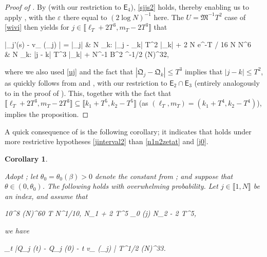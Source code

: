 \documentclass{amsart}
\numberwithin{equation}{section}
\DeclareMathOperator{\eff}{eff}
\newtheorem{cor}[thm]{Corollary}
\theoremstyle{remark}
\theoremstyle{definition}
\begin{document}
\begin{proof}[Proof of ]
		By  (with our restriction to $\mathsf{E}_4$), \eqref{sjjs2} holds, thereby enabling us to apply , with the $\varepsilon$ there equal to $(2 \log N)^{-1}$ here. The $U = \mathfrak{M}^{-1} T^2$ case of \eqref{wivi} then yields for $j \in \llbracket \ell_T + 2T^3, m_T - 2T^3 \rrbracket$ that
		\begin{flalign}
			\label{qj2} 
			\begin{aligned} 
				\big|_j'(s) - v_{\eff} (\Lambda_j) \big| = |_j| &  \log N \cdot \displaystyle\max_{k: |\mathfrak{Q}_j - _k| \le T^2} |_k| + 2 \log N \cdot e^{-T / 16 \log N} \cdot N^6 \\
				&  \log N \cdot \displaystyle\max_{k: |j - k| \le T^3} |_k| + N^{-1} \le B^2 ^{-1/2} (\log N)^{32},
			\end{aligned} 
		\end{flalign}
		
		\noindent where we also used \eqref{uj} and the fact that $|\mathfrak{Q}_j - \mathfrak{Q}_k| \le T^3$ implies that $|j-k| \le T^2$, as quickly follows from  and , with our restriction to $\mathsf{E}_2 \cap \mathsf{E}_3$ (entirely analogously to in the proof of ). This, together with the fact that $\llbracket \ell_T+ 2T^3, m_T - 2T^3 \rrbracket \subseteq \llbracket k_1 + T^5, k_2 - T^5 \rrbracket$ (as $(\ell_T, m_T) = (k_1 + T^4, k_2 - T^4)$), implies the proposition.
	\end{proof} 
	
	A quick consequence of  is the following corollary; it indicates that  holds under more restrictive hypotheses \eqref{jinterval2} than \eqref{n1n2zetat} and \eqref{j0}.

	
	
	\begin{cor}
		
		\label{q}
		
		Adopt ; let $\theta_0 = \theta_0 (\beta) > 0$ denote the constant from ; and suppose that $\theta \in (0, \theta_0)$. The following holds with overwhelming probability. Let $j \in \llbracket 1, N \rrbracket$ be an index, and assume that 
		\begin{flalign} 
			\label{jinterval2} 
			10^8 \cdot (\log N)^{60} \le T \le N^{1/10}, \quad {} \quad N_1 + 2 T^5 \le \varphi_0 (j) \le N_2 - 2 T^5,
		\end{flalign} 
		
		\noindent we have
		\begin{flalign*} 
			\displaystyle\sup_{t \in [0, T]} \big|Q_j (t) - Q_j (0) - t v_{\eff} (\lambda_j) \big| \le T^{1/2} (\log N)^{33}.
		\end{flalign*} 		 
	\end{cor} 
	
\end{document}
